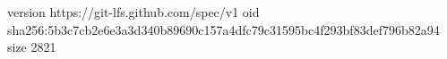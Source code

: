version https://git-lfs.github.com/spec/v1
oid sha256:5b3c7cb2e6e3a3d340b89690c157a4dfc79c31595bc4f293bf83def796b82a94
size 2821
